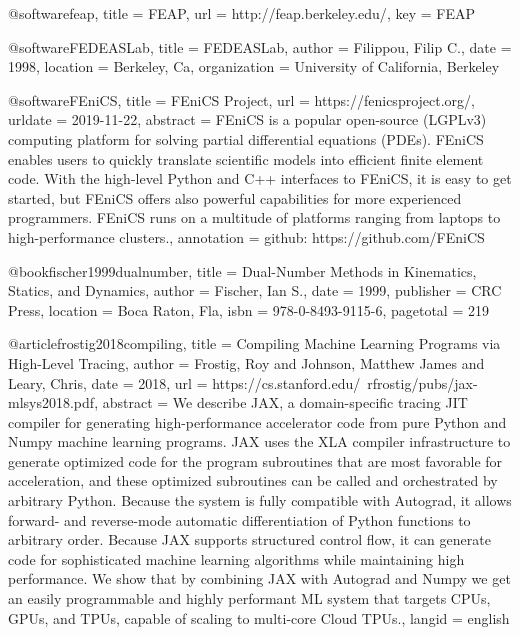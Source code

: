 @software{feap,
  title = {{{FEAP}}},
  url = {http://feap.berkeley.edu/},
  key = {FEAP}
}

@software{FEDEASLab,
  title = {{{FEDEASLab}}},
  author = {Filippou, Filip C.},
  date = {1998},
  location = {Berkeley, Ca},
  organization = {University of California, Berkeley}
}

@software{FEniCS,
  title = {{{FEniCS Project}}},
  url = {https://fenicsproject.org/},
  urldate = {2019-11-22},
  abstract = {FEniCS is a popular open-source (LGPLv3) computing platform for solving partial differential equations (PDEs). FEniCS enables users to quickly translate scientific models into efficient finite element code. With the high-level Python and C++ interfaces to FEniCS, it is easy to get started, but FEniCS offers also powerful capabilities for more experienced programmers. FEniCS runs on a multitude of platforms ranging from laptops to high-performance clusters.},
  annotation = {github: https://github.com/FEniCS}
}


@book{fischer1999dualnumber,
  title = {Dual-Number Methods in Kinematics, Statics, and Dynamics},
  author = {Fischer, Ian S.},
  date = {1999},
  publisher = {CRC Press},
  location = {Boca Raton, Fla},
  isbn = {978-0-8493-9115-6},
  pagetotal = {219}
}

@article{frostig2018compiling,
  title = {Compiling Machine Learning Programs via High-Level Tracing},
  author = {Frostig, Roy and Johnson, Matthew James and Leary, Chris},
  date = {2018},
  url = {https://cs.stanford.edu/~rfrostig/pubs/jax-mlsys2018.pdf},
  abstract = {We describe JAX, a domain-specific tracing JIT compiler for generating high-performance accelerator code from pure Python and Numpy machine learning programs. JAX uses the XLA compiler infrastructure to generate optimized code for the program subroutines that are most favorable for acceleration, and these optimized subroutines can be called and orchestrated by arbitrary Python. Because the system is fully compatible with Autograd, it allows forward- and reverse-mode automatic differentiation of Python functions to arbitrary order. Because JAX supports structured control flow, it can generate code for sophisticated machine learning algorithms while maintaining high performance. We show that by combining JAX with Autograd and Numpy we get an easily programmable and highly performant ML system that targets CPUs, GPUs, and TPUs, capable of scaling to multi-core Cloud TPUs.},
  langid = {english}
}


